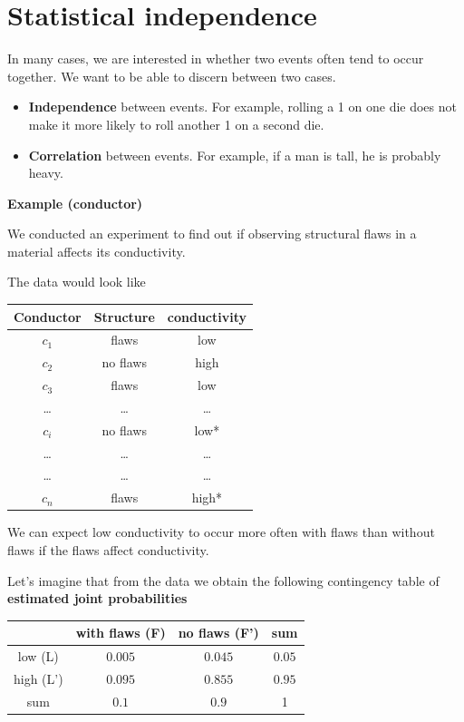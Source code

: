 \documentclass[
]{book}
\begin{document}
\hypertarget{statistical-independence}{%
\section{Statistical independence}\label{statistical-independence}}

In many cases, we are interested in whether two events often tend to occur together. We want to be able to discern between two cases.

\begin{itemize}
\item
  \textbf{Independence} between events. For example, rolling a 1 on one die does not make it more likely to roll another 1 on a second die.
\item
  \textbf{Correlation} between events. For example, if a man is tall, he is probably heavy.
\end{itemize}

\textbf{Example (conductor)}

We conducted an experiment to find out if observing structural flaws in a material affects its conductivity.

The data would look like

\begin{longtable}[]{@{}ccc@{}}
\toprule
Conductor & Structure & conductivity \\
\midrule
\endhead
\(c_1\) & flaws & low \\
\(c_2\) & no flaws & high \\
\(c_3\) & flaws & low \\
\ldots{} & \ldots{} & \ldots{} \\
\(c_i\) & no flaws & low* \\
\ldots{} & \ldots{} & \ldots{} \\
\ldots{} & \ldots{} & \ldots{} \\
\(c_n\) & flaws & high* \\
\bottomrule
\end{longtable}

We can expect low conductivity to occur more often with flaws than without flaws if the flaws affect conductivity.

Let's imagine that from the data we obtain the following contingency table of \textbf{estimated joint probabilities}

\begin{longtable}[]{@{}cccc@{}}
\toprule
& with flaws (F) & no flaws (F') & sum \\
\midrule
\endhead
low (L) & \(0.005\) & \(0.045\) & \(0.05\) \\
high (L') & \(0.095\) & \(0.855\) & \(0.95\) \\
sum & \(0.1\) & \(0.9\) & 1 \\
\bottomrule
\end{longtable}
\end{document}
